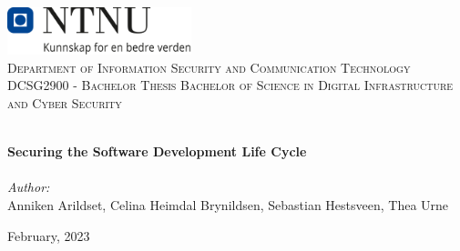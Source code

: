 \begin{titlepage}
\vbox{ }
\vbox{ }
\begin{center}
\includegraphics[width=0.40\textwidth]{Images/NTNU_logo.png}\\[1cm]
\textsc{\LARGE Department of Information Security and Communication Technology}\\[1.5cm]
\textsc{\Large DCSG2900 -  Bachelor Thesis Bachelor of Science in Digital Infrastructure and Cyber Security}\\[0.5cm]
\vbox{ }

\HRule \\[0.4cm]
{ \huge \bfseries Securing the Software Development Life Cycle}\\[0.4cm]
\HRule \\[1.5cm]

\large
\emph{Author:}\\
Anniken Arildset, Celina Heimdal Brynildsen, Sebastian Hestsveen, Thea Urne
\vfill

{\large February, 2023}
\end{center}
\end{titlepage}